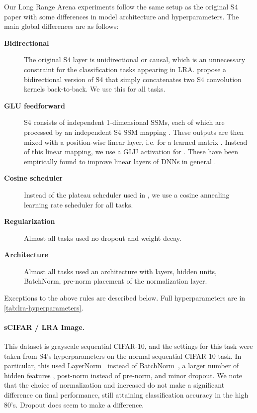 \documentclass{article}
\begin{document}
Our Long Range Arena experiments follow the same setup as the original S4 paper with some differences in model architecture and hyperparameters.
The main global differences are as follows:
\begin{description}\item [\textbf{Bidirectional}] The original S4 layer is unidirectional or causal, which is an unnecessary constraint for the classification tasks appearing in LRA. \citet{goel2022sashimi} propose a bidirectional version of S4 that simply concatenates two S4 convolution kernels back-to-back. We use this for all tasks.
  \item [\textbf{GLU feedforward}] S4 consists of  independent 1-dimensional SSMs, each of which are processed by an independent S4 SSM mapping . These outputs are then mixed with a position-wise linear layer, i.e.  for a learned matrix .
    Instead of this linear mapping, we use a GLU activation  for  \citep{dauphin2017language}.
    These have been empirically found to improve linear layers of DNNs in general \citep{shazeer2020glu}.
  \item [\textbf{Cosine scheduler}] Instead of the plateau scheduler used in \citep{gu2022efficiently}, we use a cosine annealing learning rate scheduler for all tasks.
  \item [\textbf{Regularization}] Almost all tasks used no dropout and  weight decay.
  \item [\textbf{Architecture}] Almost all tasks used an architecture with  layers,  hidden units, BatchNorm, pre-norm placement of the normalization layer.
\end{description}

Exceptions to the above rules are described below.
Full hyperparameters are in \cref{tab:lra-hyperparameters}.

\paragraph{sCIFAR / LRA Image.}
This dataset is grayscale sequential CIFAR-10, and the settings for this task were taken from S4's hyperparameters on the normal sequential CIFAR-10 task.
In particular, this used LayerNorm~\citep{ba2016layer} instead of BatchNorm~\citep{ioffe2015batch}, a larger number of hidden features , post-norm instead of pre-norm, and minor dropout.
We note that the choice of normalization and increased  do not make a significant difference on final performance, still attaining classification accuracy in the high 80's.
Dropout does seem to make a difference.
\end{document}
